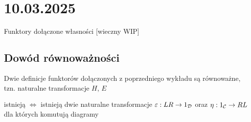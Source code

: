 \section{10.03.2025}{Funktory dołączone własności [wieczny WIP]}

\subsection{Dowód równoważności}

\begin{theorem}{}{}
  Dwie definicje funktorów dołączonych z poprzedniego wykładu są równoważne, tzn. naturalne transformacje $H$, $E$
  \begin{center}
  \end{center}
  istnieją $\iff$ istnieją dwie naturalne transformacje $\varepsilon:LR\to 1_{\mathcal{D}}$ oraz $\eta:1_{\mathcal{C}}\to RL$ dla których komutują diagramy
  \begin{center}
  \end{center}
\end{theorem}

